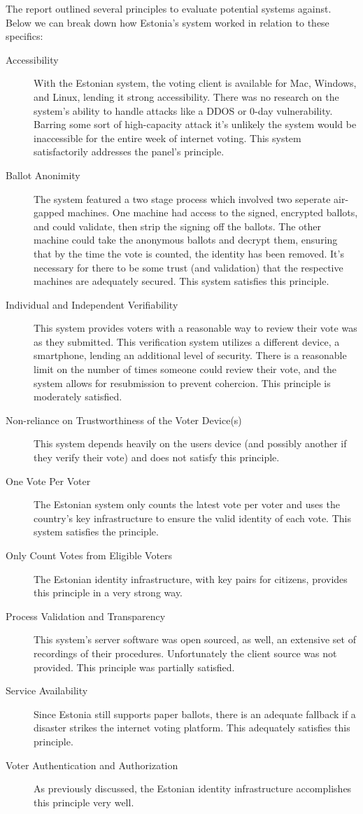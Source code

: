 \documentclass[a4paper, 11pt]{article} %
\begin{document}
The report \cite{internet-voting-report} outlined several principles to evaluate potential systems against. Below we can break down how Estonia's system worked in relation to these specifics:

\begin{description}
    \item[Accessibility] With the Estonian system, the voting client is available for Mac, Windows, and Linux, lending it strong accessibility. There was no research on the system's ability to handle attacks like a DDOS or 0-day vulnerability. Barring some sort of high-capacity attack it's unlikely the system would be inaccessible for the entire week of internet voting. This system satisfactorily addresses the panel's principle.
    \item[Ballot Anonimity] The system featured a two stage process which involved two seperate air-gapped machines. One machine had access to the signed, encrypted ballots, and could validate, then strip the signing off the ballots. The other machine could take the anonymous ballots and decrypt them, ensuring that by the time the vote is counted, the identity has been removed. It's necessary for there to be some trust (and validation) that the respective machines are adequately secured. This system satisfies this principle.
    \item[Individual and Independent Verifiability] This system provides voters with a reasonable way to review their vote was as they submitted. This verification system utilizes a different device, a smartphone, lending an additional level of security. There is a reasonable limit on the number of times someone could review their vote, and the system allows for resubmission to prevent cohercion. This principle is moderately satisfied.
    \item[Non-reliance on Trustworthiness of the Voter Device(s)] This system depends heavily on the users device (and possibly another if they verify their vote) and does not satisfy this principle.
    \item[One Vote Per Voter] The Estonian system only counts the latest vote per voter and uses the country's key infrastructure to ensure the valid identity of each vote. This system satisfies the principle.
    \item[Only Count Votes from Eligible Voters] The Estonian identity infrastructure, with key pairs for citizens, provides this principle in a very strong way.
    \item[Process Validation and Transparency] This system's server software was open sourced, as well, an extensive set of recordings of their procedures. Unfortunately the client source was not provided. This principle was partially satisfied.
    \item[Service Availability] Since Estonia still supports paper ballots, there is an adequate fallback if a disaster strikes the internet voting platform. This adequately satisfies this principle.
    \item[Voter Authentication and Authorization] As previously discussed, the Estonian identity infrastructure accomplishes this principle very well.
\end{description}
\end{document}
